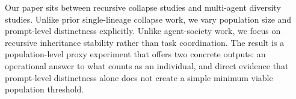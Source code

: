 Our paper sits between recursive collapse studies and multi-agent diversity studies. Unlike prior single-lineage collapse work, we vary population size and prompt-level distinctness explicitly. Unlike agent-society work, we focus on recursive inheritance stability rather than task coordination. The result is a population-level proxy experiment that offers two concrete outputs: an operational answer to what counts as an individual, and direct evidence that prompt-level distinctness alone does not create a simple minimum viable population threshold.
